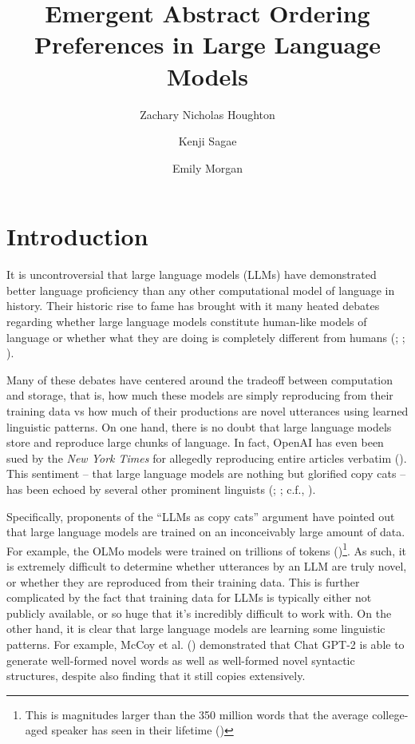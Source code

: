 \documentclass[
  nottoc]{article}
\title{Emergent Abstract Ordering Preferences in Large Language Models}
\author{Zachary Nicholas Houghton \and Kenji Sagae \and Emily Morgan}
\date{}
\begin{document}
\maketitle


\section{Introduction}\label{sec-introduction}

It is uncontroversial that large language models (LLMs) have
demonstrated better language proficiency than any other computational
model of language in history. Their historic rise to fame has brought
with it many heated debates regarding whether large language models
constitute human-like models of language or whether what they are doing
is completely different from humans
(;
;
).

Many of these debates have centered around the tradeoff between
computation and storage, that is, how much these models are simply
reproducing from their training data vs how much of their productions
are novel utterances using learned linguistic patterns. On one hand,
there is no doubt that large language models store and reproduce large
chunks of language. In fact, OpenAI has even been sued by the \emph{New
York Times} for allegedly reproducing entire articles verbatim
(). This sentiment -- that large language
models are nothing but glorified copy cats -- has been echoed by several
other prominent linguists
(;
; c.f.,
).

Specifically, proponents of the ``LLMs as copy cats'' argument have
pointed out that large language models are trained on an inconceivably
large amount of data. For example, the OLMo models were trained on
trillions of tokens
()\footnote{This is magnitudes larger than the 350 million words
  that the average college-aged speaker has seen in their lifetime
  ()}. As such, it is
extremely difficult to determine whether utterances by an LLM are truly
novel, or whether they are reproduced from their training data. This is
further complicated by the fact that training data for LLMs is typically
either not publicly available, or so huge that it's incredibly difficult
to work with. On the other hand, it is clear that large language models
are learning some linguistic patterns. For example, McCoy et al.
() demonstrated that Chat GPT-2 is
able to generate well-formed novel words as well as well-formed novel
syntactic structures, despite also finding that it still copies
extensively.
\end{document}
